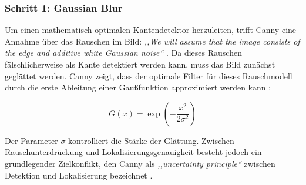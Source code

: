 \subsubsection{Schritt 1: Gaussian Blur}

Um einen mathematisch optimalen Kantendetektor herzuleiten, trifft Canny
eine Annahme über das Rauschen im Bild: \textit{,,We will assume that the
image consists of the edge and additive white Gaussian noise``}
\cite[S.~680]{canny1986}. Da dieses Rauschen fälschlicherweise als Kante
detektiert werden kann, muss das Bild zunächst geglättet werden. Canny
zeigt, dass der optimale Filter für dieses Rauschmodell durch die erste
Ableitung einer Gaußfunktion approximiert werden kann
\cite[S.~687]{canny1986}:

\begin{equation}
    \label{eq:gaussian}
    G(x) = \exp\left(-\frac{x^2}{2\sigma^2}\right)
\end{equation}

Der Parameter $\sigma$ kontrolliert die Stärke der Glättung. Zwischen
Rauschunterdrückung und Lokalisierungsgenauigkeit besteht jedoch ein
grundlegender Zielkonflikt, den Canny als
\textit{,,uncertainty principle``} zwischen Detektion und Lokalisierung
bezeichnet \cite[S.~684]{canny1986}.